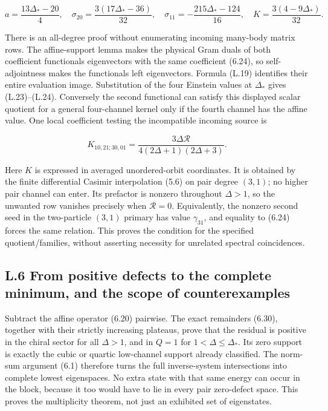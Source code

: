 \[
a=\frac{13\Delta_*-20}{4},\quad
\sigma_{20}=\frac{3(17\Delta_*-36)}{32},\quad
\sigma_{11}=-\frac{215\Delta_*-124}{16},\quad
K=\frac{3(4-9\Delta_*)}{32}.
\tag{L.24}
\]

There is an all-degree proof without enumerating incoming many-body matrix rows. The affine-support lemma makes the physical Gram duals of both coefficient functionals eigenvectors with the same coefficient (6.24), so self-adjointness makes the functionals left eigenvectors. Formula (L.19) identifies their entire evaluation image. Substitution of the four Einstein values at \(\Delta_*\) gives (L.23)--(L.24). Conversely the second functional can satisfy this displayed scalar quotient for a general four-channel kernel only if the fourth channel has the affine value. One local coefficient testing the incompatible incoming source is

\[
K_{10,21;30,01}=\frac{3\Delta\mathcal R}{4(2\Delta+1)(2\Delta+3)}.
\tag{L.25}
\]

Here \(K\) is expressed in averaged unordered-orbit coordinates. It is obtained by the finite differential Casimir interpolation (5.6) on pair degree \((3,1)\); no higher pair channel can enter. Its prefactor is nonzero throughout \(\Delta>1\), so the unwanted row vanishes precisely when \(\mathcal R=0\). Equivalently, the nonzero second seed in the two-particle \((3,1)\) primary has value \(\gamma_{31}\), and equality to (6.24) forces the same relation. This proves the condition for the specified quotient/families, without asserting necessity for unrelated spectral coincidences.

\hypertarget{l.6-from-positive-defects-to-the-complete-minimum-and-the-scope-of-counterexamples}{%
\subsection{L.6 From positive defects to the complete minimum, and the scope of counterexamples}\label{l.6-from-positive-defects-to-the-complete-minimum-and-the-scope-of-counterexamples}}

Subtract the affine operator (6.20) pairwise. The exact remainders (6.30), together with their strictly increasing plateaus, prove that the residual is positive in the chiral sector for all \(\Delta>1\), and in \(Q=1\) for \(1<\Delta\le\Delta_*\). Its zero support is exactly the cubic or quartic low-channel support already classified. The norm-sum argument (6.1) therefore turns the full inverse-system intersections into complete lowest eigenspaces. No extra state with that same energy can occur in the block, because it too would have to lie in every pair zero-defect space. This proves the multiplicity theorem, not just an exhibited set of eigenstates.

